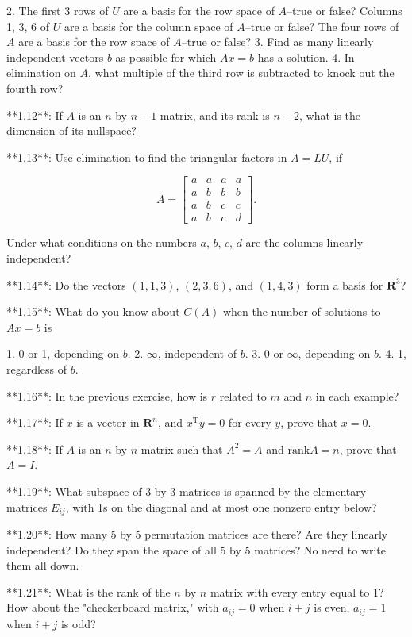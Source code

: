 2. The first 3 rows of \(U\) are a basis for the row space of \(A\)--true or false? Columns 1, 3, 6 of \(U\) are a basis for the column space of \(A\)--true or false? The four rows of \(A\) are a basis for the row space of \(A\)--true or false? 3. Find as many linearly independent vectors \(b\) as possible for which \(Ax=b\) has a solution. 4. In elimination on \(A\), what multiple of the third row is subtracted to knock out the fourth row?

**1.12**: If \(A\) is an \(n\) by \(n-1\) matrix, and its rank is \(n-2\), what is the dimension of its nullspace?

**1.13**: Use elimination to find the triangular factors in \(A=LU\), if

\[A=\begin{bmatrix}a&a&a&a\\ a&b&b&b\\ a&b&c&c\\ a&b&c&d\end{bmatrix}.\]

Under what conditions on the numbers \(a\), \(b\), \(c\), \(d\) are the columns linearly independent?

**1.14**: Do the vectors \((1,1,3)\), \((2,3,6)\), and \((1,4,3)\) form a basis for \(\mathbf{R}^{3}\)?

**1.15**: What do you know about \(C(A)\) when the number of solutions to \(Ax=b\) is

1. 0 or 1, depending on \(b\).
2. \(\infty\), independent of \(b\).
3. 0 or \(\infty\), depending on \(b\).
4. 1, regardless of \(b\).

**1.16**: In the previous exercise, how is \(r\) related to \(m\) and \(n\) in each example?

**1.17**: If \(x\) is a vector in \(\mathbf{R}^{n}\), and \(x^{\mathrm{T}}y=0\) for every \(y\), prove that \(x=0\).

**1.18**: If \(A\) is an \(n\) by \(n\) matrix such that \(A^{2}=A\) and \(\mathrm{rank}A=n\), prove that \(A=I\).

**1.19**: What subspace of 3 by 3 matrices is spanned by the elementary matrices \(E_{ij}\), with 1s on the diagonal and at most one nonzero entry below?

**1.20**: How many 5 by 5 permutation matrices are there? Are they linearly independent? Do they span the space of all 5 by 5 matrices? No need to write them all down.

**1.21**: What is the rank of the \(n\) by \(n\) matrix with every entry equal to 1? How about the "checkerboard matrix," with \(a_{ij}=0\) when \(i+j\) is even, \(a_{ij}=1\) when \(i+j\) is odd? 
